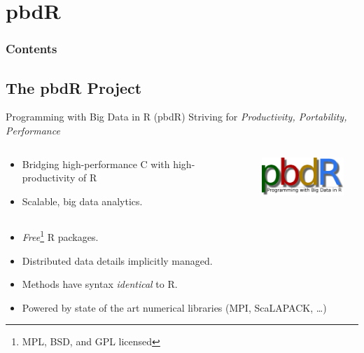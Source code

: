 \section{pbdR}

\hidenum
\begin{frame}[noframenumbering]
\frametitle{Contents}
 \tableofcontents[currentsection,hideothersubsections,sectionstyle=show/hide]
\end{frame}
\shownum


\subsection{The pbdR Project}


\begin{frame}
  \begin{block}{Programming with Big Data in R (pbdR)}
       \centering Striving for \emph{Productivity, Portability, Performance}\\[.4cm]\pause
  \begin{columns}[onlytextwidth]
    \begin{column}{0.65\textwidth}
  \begin{itemize}[<+-|alert@+>]
    \item Bridging high-performance C with high-productivity of R
    \item Scalable, big data analytics.
  \end{itemize}
    \end{column}
    \begin{column}{0.30\textwidth}
      \centering
       \includegraphics[width=3.4cm]{../common/pics/simple}\\[.2cm]
    \end{column}
​  \end{columns}
\begin{itemize}
    \item \emph{Free}\footnote{MPL, BSD, and GPL licensed} R packages.
    \item Distributed data details implicitly managed.
    \item Methods have syntax \emph{identical} to R.
    \item Powered by state of the art numerical libraries (MPI, ScaLAPACK, \dots)
\end{itemize}

\end{block}
\end{frame}




